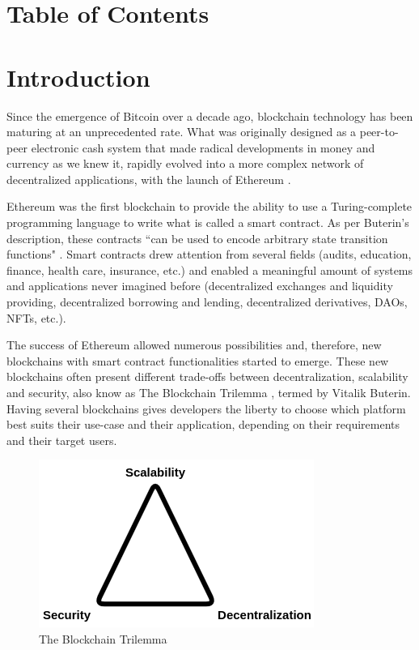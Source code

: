 \documentclass[runningheads]{llncs}
\begin{document}
\newpage

\section*{Table of Contents}
{\let\clearpage\relax \tableofcontents}
\newpage



\section{Introduction} \label{intro}

Since the emergence of Bitcoin \cite{nakamoto_2008} over a decade ago, blockchain technology has been maturing at an unprecedented rate. What was originally designed as a peer-to-peer electronic cash system that made radical developments in money and currency as we knew it, rapidly evolved into a more complex network of decentralized applications, with the launch of Ethereum \cite{buterin_2014}.

Ethereum was the first blockchain to provide the ability to use a Turing-complete programming language to write what is called a smart contract. As per Buterin's description, these contracts ``can be used to encode arbitrary state transition functions" \cite{buterin_2014}. Smart contracts drew attention from several fields (audits, education, finance, health care, insurance, etc.) and enabled a meaningful amount of systems and applications never imagined before (decentralized exchanges and liquidity providing, decentralized borrowing and lending, decentralized derivatives, DAOs, NFTs, etc.).

The success of Ethereum allowed numerous possibilities and, therefore, new blockchains with smart contract functionalities started to emerge. These new blockchains often present different trade-offs between decentralization, scalability and security, also know as The Blockchain Trilemma \cite{certik_2019}, termed by Vitalik Buterin. Having several blockchains gives developers the liberty to choose which platform best suits their use-case and their application, depending on their requirements and their target users. 

\begin{figure}
  \includegraphics[scale=0.6]{trilemma.png}
  \centering
  \caption{The Blockchain Trilemma \protect\cite{certik_2019}}
  \label{fig:trilemma}
\end{figure}
\end{document}
